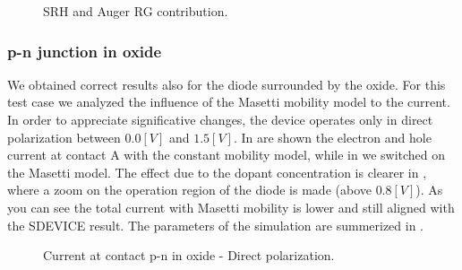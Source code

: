 \begin{figure}[!h]
\centering


\caption{SRH and Auger RG contribution.}
\label{fig: SRH Auger RG}
\end{figure}



\subsubsection{p-n junction in oxide}

We obtained correct results also for the diode surrounded by the oxide. For this test case we analyzed the influence of the Masetti mobility model to the current. In order to appreciate significative changes, the device operates only in direct polarization between $0.0[V]$ and $1.5[V]$.
In  are shown the electron and hole current at contact A with the constant mobility model, while in  we switched on the Masetti model. The effect due to the dopant concentration is clearer in , where a zoom on the  operation region of the diode is made (above $0.8[V]$). As you can see the total current with Masetti mobility is lower and still aligned with the SDEVICE result. The parameters of the simulation are summerized in .



\begin{figure}[!h]

\centering
{}


\caption{Current at contact p-n in oxide - Direct polarization.}

\end{figure}


